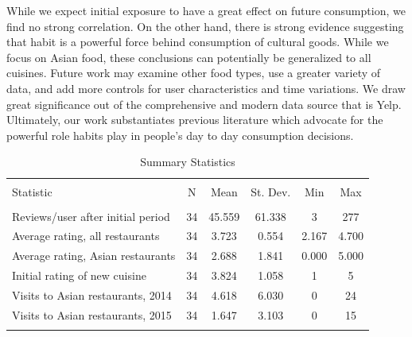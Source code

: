 \documentclass[Journal,letterpaper, NoLineNumbers]{ascelike-new}
\begin{document}
While we expect initial exposure to have a great effect on future consumption, we find no strong correlation. On the other hand, there is strong evidence suggesting that habit is a powerful force behind consumption of cultural goods. While we focus on Asian food, these conclusions can potentially be generalized to all cuisines. Future work may examine other food types, use a greater variety of data, and add more controls for user characteristics and time variations. We draw great significance out of the comprehensive and modern data source that is Yelp. Ultimately, our work substantiates previous literature which advocate for the powerful role habits play in people's day to day consumption decisions. 


\begin{table}[!htbp] \centering 
  \caption{Summary Statistics} 
  \label{} 
\begin{tabular}{@{\extracolsep{5pt}}lccccc} 
\\[-1.8ex]\hline 
\hline \\[-1.8ex] 
Statistic & \multicolumn{1}{c}{N} & \multicolumn{1}{c}{Mean} & \multicolumn{1}{c}{St. Dev.} & \multicolumn{1}{c}{Min} & \multicolumn{1}{c}{Max} \\ 
\hline \\[-1.8ex] 
Reviews/user after initial period & 34 & 45.559 & 61.338 & 3 & 277 \\ 
Average rating, all restaurants & 34 & 3.723 & 0.554 & 2.167 & 4.700 \\ 
Average rating, Asian restaurants & 34 & 2.688 & 1.841 & 0.000 & 5.000 \\ 
Initial rating of new cuisine & 34 & 3.824 & 1.058 & 1 & 5 \\ 
Visits to Asian restaurants, 2014 & 34 & 4.618 & 6.030 & 0 & 24 \\ 
Visits to Asian restaurants, 2015 & 34 & 1.647 & 3.103 & 0 & 15 \\ 
\hline \\[-1.8ex] 
\end{tabular} 
\end{table} 
\end{document}
